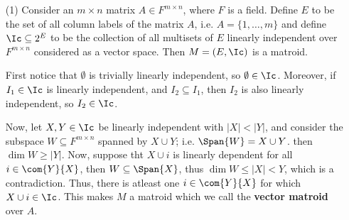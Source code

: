 \begin{example}
    \begin{enumerate}
        \item[(1)] Consider an $m \times n$ matrix  $A \in F^{m \times n}$,
            where $F$ is a field. Define $E$ to  be the set of all column labels
            of the matrix $A$, i.e.  $A=\{1, \dots, m\}$ and define $\Ic
            \subseteq 2^E$ to be the collection of all multisets of $E$
            linearly independent over $F^{m \times n}$ considered as a vector
            space. Then $M=(E,\Ic)$ is a matroid.

            First notice that $\emptyset$ is trivially linearly independent, so
             $\emptyset \in \Ic$. Moreover, if $I_1 \in \Ic$ is linearly
             independent, and $I_2 \subseteq I_1$, then $I_2$ is also linearly
             independent, so  $I_2 \in \Ic$.

             Now, let $X,Y \in \Ic$ be linearly independent with $|X|<|Y|$, and
             consider the subspace $W \subseteq F^{m \times n}$ spanned by $X
             \cup Y$; i.e. $\Span{W}=X \cup Y$. then $\dim{W} \geq |Y|$. Now,
             suppose tht $X \cup i$ is linearly dependent for all  $i \in
             \com{Y}{X}$, then $W \subseteq \Span{X}$, thus $\dim{W} \leq
             |X|<Y$, which is a contradiction. Thus, there is atleast one $i \in
             \com{Y}{X}$ for which $X \cup i \in \Ic$. This makes $M$ a matroid
             which we call the  \textbf{vector matroid} over $A$.


\end{enumerate}
\end{example}
